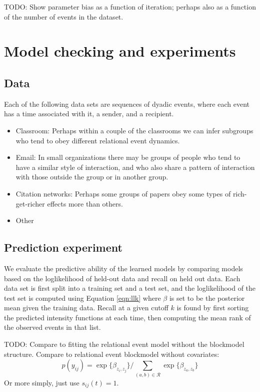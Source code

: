 \documentclass{article}
\begin{document}
TODO: Show parameter bias as a function of iteration; perhaps also as a function of the number of events in the dataset.

\section{Model checking and experiments}

\subsection*{Data}

Each of the following data sets are sequences of dyadic events, where each event has a time associated with it, a sender, and a recipient.

\begin{itemize}
\item Classroom:  Perhaps within a couple of the classrooms we can infer subgroups who tend to obey different relational event dynamics.
\item Email: In small organizations there may be groups of people who tend to have a similar style of interaction, and who also share a pattern of interaction with those outside the group or in another group.
\item Citation networks: Perhaps some groups of papers obey some types of rich-get-richer effects more than others.
\item Other
\end{itemize}

\subsection*{Prediction experiment}
We evaluate the predictive ability of the learned models by comparing models based on the loglikelihood of held-out data and recall on held out data.  Each data set is first split into a training set and a test set, and the loglikelihood of the test set is computed using Equation \ref{eqn:llk} where $\beta$ is set to be the posterior mean given the training data.  Recall at a given cutoff $k$ is found by first sorting the predicted intensity functions at each time, then computing the mean rank of the observed events in that list.

TODO: Compare to fitting the relational event model without the blockmodel structure.  Compare to relational event blockmodel without covariates: $$p(y_{ij}) = \exp\{\beta_{z_i,z_j}\} / \sum_{(a,b) \in \mathcal{R}}\exp\{\beta_{z_{a},z_{b}}\} $$
Or more simply, just use $s_{ij}(t) = 1$.
\end{document}
